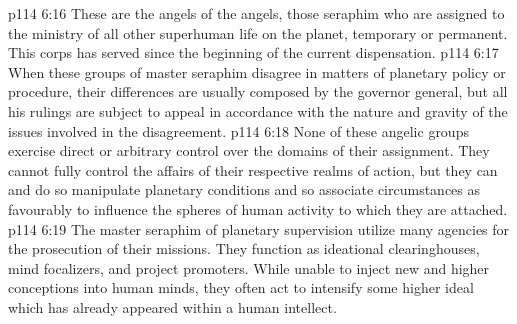 \vs p114 6:16 \bibnobreakspace {} These are the angels of the angels, those seraphim who are assigned to the ministry of all other superhuman life on the planet, temporary or permanent. This corps has served since the beginning of the current dispensation.
\vs p114 6:17 \pc When these groups of master seraphim disagree in matters of planetary policy or procedure, their differences are usually composed by the governor general, but all his rulings are subject to appeal in accordance with the nature and gravity of the issues involved in the disagreement.
\vs p114 6:18 None of these angelic groups exercise direct or arbitrary control over the domains of their assignment. They cannot fully control the affairs of their respective realms of action, but they can and do so manipulate planetary conditions and so associate circumstances as favourably to influence the spheres of human activity to which they are attached.
\vs p114 6:19 The master seraphim of planetary supervision utilize many agencies for the prosecution of their missions. They function as ideational clearinghouses, mind focalizers, and project promoters. While unable to inject new and higher conceptions into human minds, they often act to intensify some higher ideal which has already appeared within a human intellect.

